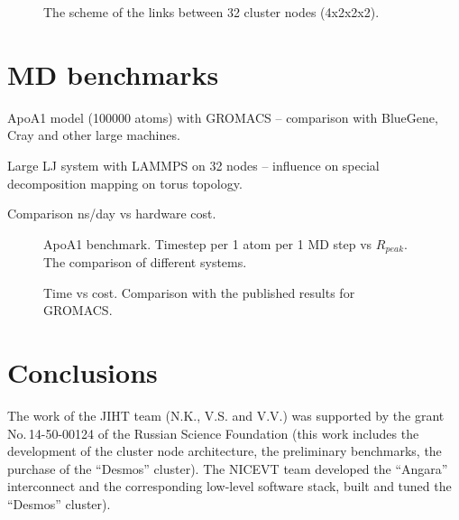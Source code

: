 \documentclass{llncs}
\begin{document}
\begin{figure}[h]
\centering
\caption{The scheme of the links between 32 cluster nodes (4x2x2x2).}
\end{figure}


\section{MD benchmarks}

ApoA1 model (100000 atoms) with GROMACS – comparison with BlueGene, Cray and other large machines.

Large LJ system with LAMMPS on 32 nodes – influence on special decomposition mapping on torus topology.

Comparison ns/day vs hardware cost.

\begin{figure}[h]
\centering
\caption{ApoA1 benchmark. Timestep per 1 atom per 1 MD step vs $R_{peak}$. The comparison of different systems.}
\end{figure}

\begin{figure}[h]
\centering
\caption{Time vs cost. Comparison with the published results for GROMACS.}
\end{figure}


\section{Conclusions}

The work of the JIHT team (N.K., V.S. and V.V.) was supported by the grant No.\,14-50-00124 of the Russian Science Foundation (this work includes the development of the cluster node architecture, the preliminary benchmarks, the purchase of the ``Desmos'' cluster). The NICEVT team developed the ``Angara'' interconnect and the corresponding low-level software stack, built and tuned the ``Desmos'' cluster).


%
\end{document}
